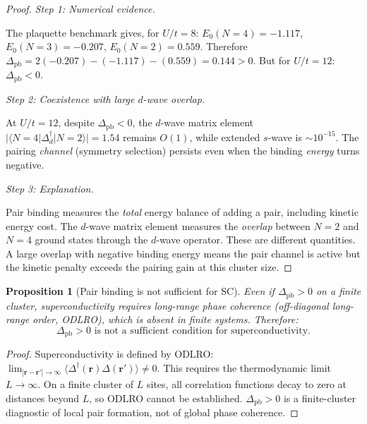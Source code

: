 \documentclass[12pt]{article}
\theoremstyle{plain}
\newtheorem{proposition}[theorem]{Proposition}
\theoremstyle{definition}
\numberwithin{equation}{section}
\begin{document}
\begin{proof}
\emph{Step 1: Numerical evidence.}

The plaquette benchmark gives, for $U/t=8$:
$E_0(N\!=\!4)=-1.117$, $E_0(N\!=\!3)=-0.207$, $E_0(N\!=\!2)=0.559$.
Therefore $\Delta_{\mathrm{pb}}=2(-0.207)-(-1.117)-(0.559)
=0.144>0$.  But for $U/t=12$:
$\Delta_{\mathrm{pb}}<0$.

\emph{Step 2: Coexistence with large $d$-wave overlap.}

At $U/t=12$, despite $\Delta_{\mathrm{pb}}<0$, the $d$-wave matrix
element $|\langle N\!=\!4|\Delta_d^\dagger|N\!=\!2\rangle|=1.54$
remains $O(1)$, while extended $s$-wave is $\sim10^{-15}$.
The pairing \emph{channel} (symmetry selection) persists even when
the binding \emph{energy} turns negative.

\emph{Step 3: Explanation.}

Pair binding measures the \emph{total} energy balance of adding a
pair, including kinetic energy cost.  The $d$-wave matrix element
measures the \emph{overlap} between $N\!=\!2$ and $N\!=\!4$ ground
states through the $d$-wave operator.  These are different
quantities.  A large overlap with negative binding energy means
the pair channel is active but the kinetic penalty exceeds the
pairing gain at this cluster size.
\end{proof}

\begin{proposition}[Pair binding is not sufficient for SC]\label{prop:notsuff}
Even if $\Delta_{\mathrm{pb}}>0$ on a finite cluster, superconductivity
requires long-range phase coherence (off-diagonal long-range order,
ODLRO), which is absent in finite systems.  Therefore:
\begin{equation}
\boxed{\Delta_{\mathrm{pb}}>0\text{ is not a sufficient condition
for superconductivity.}}
\end{equation}
\end{proposition}

\begin{proof}
Superconductivity is defined by ODLRO:
$\lim_{|\bm{r}-\bm{r}'|\to\infty}
\langle\Delta^\dagger(\bm{r})\Delta(\bm{r}')\rangle\neq 0$.
This requires the thermodynamic limit $L\to\infty$.  On a finite
cluster of $L$ sites, all correlation functions decay to zero at
distances beyond $L$, so ODLRO cannot be established.
$\Delta_{\mathrm{pb}}>0$ is a finite-cluster diagnostic of local
pair formation, not of global phase coherence.
\end{proof}
\end{document}
